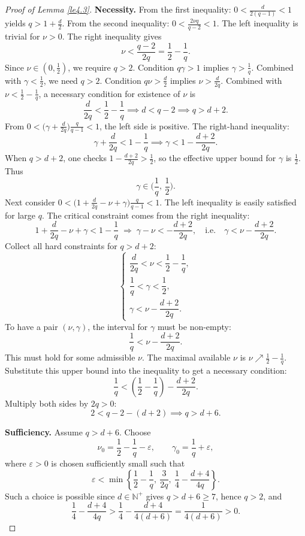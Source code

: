 \documentclass[10pt]{article}
\numberwithin{figure}{section}
\numberwithin{equation}{section}
\newcommand{\0}{{\theta}}
\def\[{\left[}\def\]{\right]}
\begin{document}
\begin{proof}[Proof of Lemma \ref{le4.3}]
\textbf{Necessity.}
From the first inequality: $0<\frac{d}{2(q-1)}<1$ yields $q>1+\frac d2$.
From the second inequality: $0<\frac{2\nu q}{q-2}<1$. The left inequality is trivial for $\nu>0$. The right inequality gives
$$
\nu < \frac{q-2}{2q}=\frac12-\frac1q.
$$
Since $\nu\in(0,\frac12)$, we require $q>2$.
Condition $q\gamma>1$ implies $\gamma>\frac1q$. Combined with $\gamma<\frac12$, we need $q>2$.
Condition $q\nu>\frac d2$ implies $\nu>\frac{d}{2q}$.
Combined with $\nu<\frac12-\frac1q$, a necessary condition for existence of $\nu$ is
$$
\frac{d}{2q}<\frac12-\frac1q \implies d < q-2 \implies q>d+2.
$$
From $0<\big(\gamma+\frac{d}{2q}\big)\frac{q}{q-1}<1$, the left side is positive. The right-hand inequality:
$$
\gamma+\frac{d}{2q}<1-\frac1q \implies \gamma<1-\frac{d+2}{2q}.
$$
When $q>d+2$, one checks $1-\frac{d+2}{2q}>\frac12$, so the effective upper bound for $\gamma$ is $\frac12$.
Thus
$$
\gamma\in\Big(\frac1q,\,\frac12\Big).
$$
Next consider $0<\big(1+\frac{d}{2q}-\nu+\gamma\big)\frac{q}{q-1}<1$.
The left inequality is easily satisfied for large $q$. The critical constraint comes from the right inequality:
$$
1+\frac{d}{2q}-\nu+\gamma < 1-\frac1q
\;\Longrightarrow\;
\gamma -\nu < -\frac{d+2}{2q},
\quad \text{i.e.}\quad
\gamma < \nu -\frac{d+2}{2q}.
$$
Collect all hard constraints for $q>d+2$:
$$
\begin{cases}
\dfrac{d}{2q}<\nu<\dfrac12-\dfrac1q,\\[0.4em]
\dfrac1q<\gamma<\dfrac12,\\[0.4em]
\gamma < \nu -\dfrac{d+2}{2q}.
\end{cases}
$$
To have a pair $(\nu,\gamma)$, the interval for $\gamma$ must be non-empty:
$$
\frac1q < \nu -\frac{d+2}{2q}.
$$
This must hold for some admissible $\nu$. The maximal available $\nu$ is $\nu\nearrow \frac12-\frac1q$. Substitute this upper bound into the inequality to get a necessary condition:
$$
\frac1q < \left(\frac12-\frac1q\right)-\frac{d+2}{2q}.
$$
Multiply both sides by $2q>0$:
$$
2 < q -2 -(d+2) \implies q>d+6.
$$

\noindent\textbf{Sufficiency.}
Assume $q>d+6$. Choose
$$
\nu_0=\frac12-\frac1q-\varepsilon,\qquad
\gamma_0=\frac1q+\varepsilon,
$$
where $\varepsilon>0$ is chosen sufficiently small such that
$$
\varepsilon<\min\left\{\frac12-\frac1q,\ \frac{3}{2q},\ \frac14-\frac{d+4}{4q}\right\}.
$$
Such a choice is possible since $d\in\mathbb N^+$ gives $q>d+6\ge7$, hence $q>2$, and
$$
\frac14-\frac{d+4}{4q}>\frac14-\frac{d+4}{4(d+6)}=\frac{1}{4(d+6)}>0.
$$


\end{proof}
\end{document}
